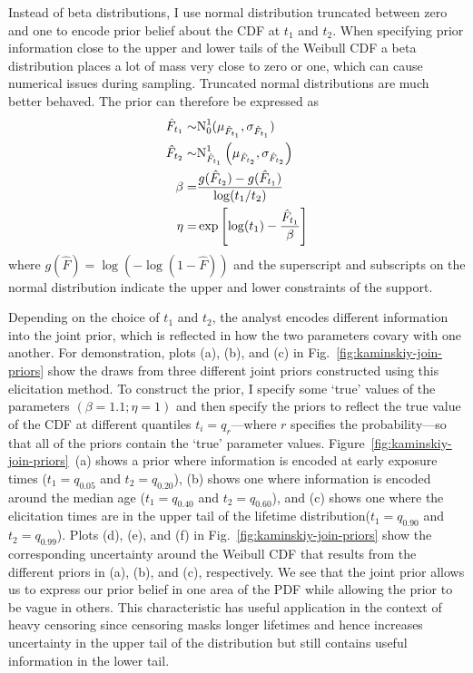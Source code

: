 Instead of beta distributions, I use normal distribution truncated between zero and one to encode prior belief about the CDF at $t_1$ and $t_2$. When specifying prior information close to the upper and lower tails of the Weibull CDF a beta distribution places a lot of mass very close to zero or one, which can cause numerical issues during sampling. Truncated normal distributions are much better behaved. The prior can therefore be expressed as
\begin{align*}
    \hat{F}_{t_1} \sim & \hbox{N}^{1}_{0}(\mu_{\hat{F}_{t_1}}, \sigma_{\hat{F}_{t_1}})             \\
    \hat{F}_{t_2} \sim & \hbox{N}^{1}_{\hat{F}_{t_1}}\left(\mu_{\hat{F}_{t_2}}, \sigma_{\hat{F}_{t_2}}\right) \\
    \beta            = & \frac{g(\hat{F}_{t_2}) - g(\hat{F}_{t_1})}{\log(t_1 / t_2)}               \\
    \eta             = & \exp\left[\log(t_1) - \frac{\hat{F}_{t_1}}{\beta}\right]
\end{align*}
where $g(\hat{F}) = \log(-\log(1 - \hat{F}))$ and the superscript and subscripts on the normal distribution indicate the upper and lower constraints of the support.

Depending on the choice of $t_1$ and $t_2$, the analyst encodes different information into the joint prior, which is reflected in how the two parameters covary with one another. For demonstration, plots (a), (b), and (c) in Fig.~\ref{fig:kaminskiy-join-priors} show the draws from three different joint priors constructed using this elicitation method. To construct the prior, I specify some `true' values of the parameters $(\beta = 1.1; \eta = 1)$ and then specify the priors to reflect the true value of the CDF at different quantiles $t_i = q_r$---where $r$ specifies the probability---so that all of the priors contain the `true' parameter values. Figure~\ref{fig:kaminskiy-join-priors}~(a) shows a prior where information is encoded at early exposure times ($t_1 = q_{0.05}$ and $t_2 = q_{0.20}$), (b) shows one where information is encoded around the median age ($t_1 = q_{0.40}$ and $t_2 = q_{0.60}$), and (c) shows one where the elicitation times are in the upper tail of the lifetime distribution($t_1 = q_{0.90}$ and $t_2 = q_{0.99}$). Plots (d), (e), and (f) in Fig.~\ref{fig:kaminskiy-join-priors} show the corresponding uncertainty around the Weibull CDF that results from the different priors in (a), (b), and (c), respectively. We see that the joint prior allows us to express our prior belief in one area of the PDF while allowing the prior to be vague in others. This characteristic has useful application in the context of heavy censoring since censoring masks longer lifetimes and hence increases uncertainty in the upper tail of the distribution but still contains useful information in the lower tail.

